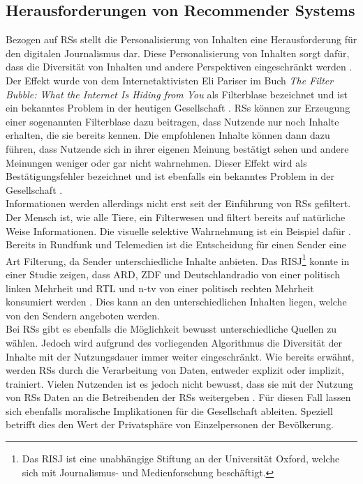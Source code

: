 \subsection{Herausforderungen von Recommender Systems}
Bezogen auf \acp{RS} stellt die Personalisierung von Inhalten eine Herausforderung für den digitalen Journalismus dar.
Diese Personalisierung von Inhalten sorgt dafür, dass die Diversität von Inhalten und andere Perspektiven eingeschränkt werden \cite{rundfunk}.
Der Effekt wurde von dem Internetaktivisten Eli Pariser im Buch \textit{The Filter Bubble: What the Internet Is Hiding from You} als Filterblase bezeichnet und ist ein bekanntes Problem in der heutigen Gesellschaft \cite{filter-bubble}.
\acp{RS} können zur Erzeugung einer sogenannten Filterblase dazu beitragen, dass Nutzende nur noch Inhalte erhalten, die sie bereits kennen.
Die empfohlenen Inhalte können dann dazu führen, dass Nutzende sich in ihrer eigenen Meinung bestätigt sehen und andere Meinungen weniger oder gar nicht wahrnehmen.
Dieser Effekt wird als Bestätigungsfehler bezeichnet und ist ebenfalls ein bekanntes Problem in der Gesellschaft \cite{reasoning-rule}. \\

Informationen werden allerdings nicht erst seit der Einführung von \acp{RS} gefiltert.
Der Mensch ist, wie alle Tiere, ein \glqq Filterwesen\grqq{} und filtert bereits auf natürliche Weise Informationen.
Die visuelle selektive Wahrnehmung ist ein Beispiel dafür \cite{selective-perception}.
Bereits in Rundfunk und Telemedien ist die Entscheidung für einen Sender eine Art Filterung, da Sender unterschiedliche Inhalte anbieten.
Das \ac{RISJ}\footnote{Das \ac{RISJ} ist eine unabhängige Stiftung an der Universität Oxford, welche sich mit Journalismus- und Medienforschung beschäftigt.} konnte in einer Studie zeigen, dass ARD, ZDF und Deutschlandradio von einer politisch linken Mehrheit und RTL und n-tv von einer politisch rechten Mehrheit konsumiert werden \cite{public-service-news}.
Dies kann an den unterschiedlichen Inhalten liegen, welche von den Sendern angeboten werden. \\

Bei \acp{RS} gibt es ebenfalls die Möglichkeit bewusst unterschiedliche Quellen zu wählen.
Jedoch wird aufgrund des vorliegenden Algorithmus die Diversität der Inhalte mit der Nutzungsdauer immer weiter eingeschränkt.
Wie bereits erwähnt, werden \acp{RS} durch die Verarbeitung von Daten, entweder explizit oder implizit, trainiert.
Vielen Nutzenden ist es jedoch nicht bewusst, dass sie mit der Nutzung von \acp{RS} Daten an die Betreibenden der \acp{RS} weitergeben \cite{privacy-rs}.
Für diesen Fall lassen sich ebenfalls moralische Implikationen für die Gesellschaft ableiten.
Speziell betrifft dies den Wert der Privatsphäre von Einzelpersonen der Bevölkerung.\\

